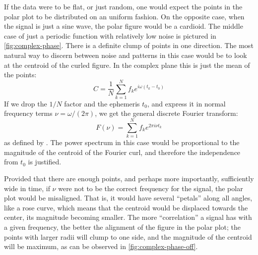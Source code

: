 	If the data were to be flat, or just random, one would expect the points in the polar plot to be distributed on an uniform fashion.
	On the opposite case, when the signal is just a sine wave, the polar figure would be a cardioid. 
	The middle case of just a periodic function with relatively low noise is pictured in \autoref{fig:complex-phase}.
	There is a definite clump of points in one direction.
	The most natural way to discern between noise and patterns in this case would be to look at the centroid of the curled figure. 
	In the complex plane this is just the mean of the points:
	\begin{equation}
		C = \frac{1}{N}\sum_{k=1}^N f_k e^{i \omega (t_k-t_0)} \label{eq:centroid}
	\end{equation}
	If we drop the $1/N$ factor and the ephemeris $t_0$, and express it in normal frequency terms $\nu=\omega/(2\pi)$, we get the general discrete Fourier transform:
	\begin{equation}
		F(\nu) = \sum_{k=1}^N f_k e^{2\pi i \nu t_k} \label{eq:fourier}
	\end{equation} 
	as defined by \cite{Deeming1975,Thomson1971,Schuster1898}. 
	The power spectrum in this case would be proportional to the magnitude of the centroid of the Fourier curl, 
	and therefore the independence from $t_0$ is justified.
	
	Provided that there are enough points, and perhaps more importantly, sufficiently wide in time, 
	if $\nu$ were not to be the correct frequency for the signal, the polar plot would be misaligned.
	That is, it would have several \enquote{petals} along all angles, like a rose curve,
	which means that the centroid would be displaced towards the center, its magnitude becoming smaller.
	The more \enquote{correlation} a signal has with a given frequency, the better the alignment of the figure in the polar plot;
	the points with larger radii will clump to one side, and the magnitude of the centroid will be maximum, as can be observed in \autoref{fig:complex-phase-off}.
	
